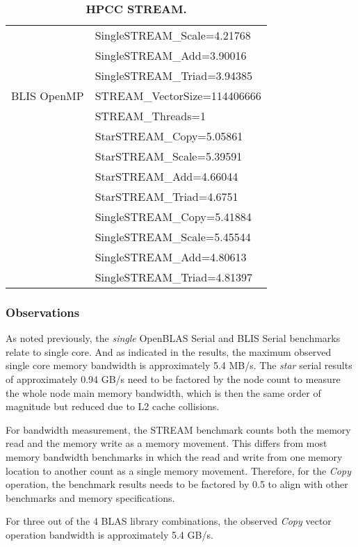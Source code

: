 \begin{table}[]
\begin{center}
\begin{tabular}{ |l|l| }
                & SingleSTREAM\_Scale=4.21768 \\
                & SingleSTREAM\_Add=3.90016 \\
                & SingleSTREAM\_Triad=3.94385 \\
\hline
BLIS OpenMP     & STREAM\_VectorSize=114406666 \\
                & STREAM\_Threads=1 \\
                & StarSTREAM\_Copy=5.05861 \\
                & StarSTREAM\_Scale=5.39591 \\
                & StarSTREAM\_Add=4.66044 \\
                & StarSTREAM\_Triad=4.6751 \\
                & SingleSTREAM\_Copy=5.41884 \\
                & SingleSTREAM\_Scale=5.45544 \\
                & SingleSTREAM\_Add=4.80613 \\
                & SingleSTREAM\_Triad=4.81397 \\
\hline
\end{tabular}
\end{center}
\caption{\label{tab:table-name}\textbf{HPCC STREAM.}}
\end{table}


\subsubsection{Observations}

As noted previously, the \emph{single} OpenBLAS Serial and BLIS Serial benchmarks relate to single core. And as indicated in the results, the maximum observed single core memory bandwidth is approximately 5.4 MB/s. The \emph{star} serial results of approximately 0.94 GB/s need to be factored by the node count to measure the whole node main memory bandwidth, which is then the same order of magnitude but reduced due to L2 cache collisions. 

For bandwidth measurement, the STREAM benchmark counts both the memory read and the memory write as a memory movement. This differs from most memory bandwidth benchmarks in which the read and write from one memory location to another count as a single memory movement. Therefore, for the \emph{Copy} operation, the benchmark results needs to be factored by 0.5 to align with other benchmarks and memory specifications.

For three out of the 4 BLAS library combinations, the observed \emph{Copy} vector operation bandwidth is approximately 5.4 GB/s.

